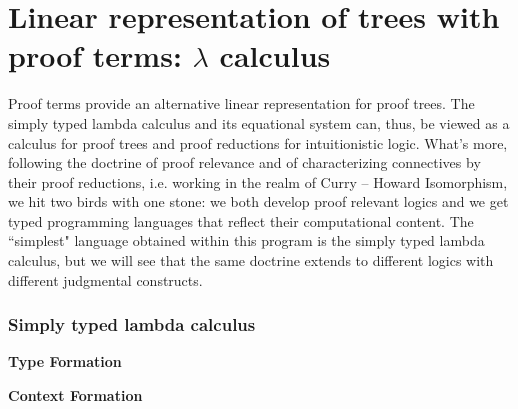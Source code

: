 \section{Linear representation of trees  with proof terms: $\lambda$ calculus}
Proof terms provide an alternative linear representation for proof trees. The simply typed lambda calculus and its equational system can, thus, be viewed as a calculus for proof trees and proof reductions for  intuitionistic logic. What's more, following the doctrine of proof relevance and of characterizing connectives by their proof reductions, i.e. working in the realm of Curry -- Howard Isomorphism, we hit two birds with one stone: we both develop proof relevant logics and we get typed programming languages that reflect their computational content. The ``simplest" language obtained within this program is the simply typed lambda calculus, but we will see that the same doctrine  extends to different logics with different judgmental constructs.
  
\subsubsection{Simply typed lambda calculus}
\begin{mdframed}
\textbf{Type Formation}
\end{mdframed}

\begin{mdframed}
\textbf{Context Formation}
\end{mdframed}

